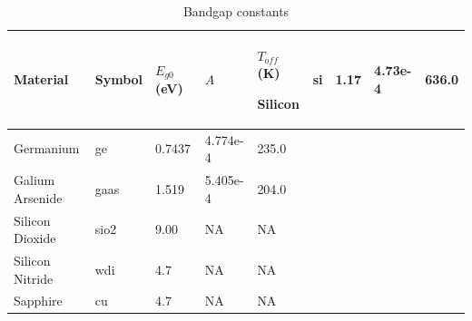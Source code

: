 



\small

\begin{longtable}[htbp]{|
>{\setlength{\hsize}{0.75\hsize}}Y|
>{\setlength{\hsize}{0.50\hsize}}Y|
>{\setlength{\hsize}{0.50\hsize}}Y|
>{\setlength{\hsize}{0.50\hsize}}Y|
>{\setlength{\hsize}{0.50\hsize}}Y|} 

  \caption[Bandgap constants]{Bandgap constants \label{bandgapTable}}
\\
\hline

\color{white} \bf Material &
\color{white} \bf Symbol &
\color{white} \bf $E_{g0}$ (eV) &
\color{white} \bf $A$ &
\color{white} \bf $T_{off}$ (K) \endhead \hline 

   Silicon         & si   & 1.17   & 4.73e-4  & 636.0 \\ \hline
   Germanium       & ge   & 0.7437 & 4.774e-4 & 235.0 \\ \hline
   Galium Arsenide & gaas & 1.519  & 5.405e-4 & 204.0 \\ \hline
   Silicon Dioxide & sio2 & 9.00   & NA & NA \\ \hline
   Silicon Nitride & wdi  & 4.7    & NA & NA \\ \hline
   Sapphire        & cu   & 4.7    & NA & NA \\ \hline

\end{longtable}


